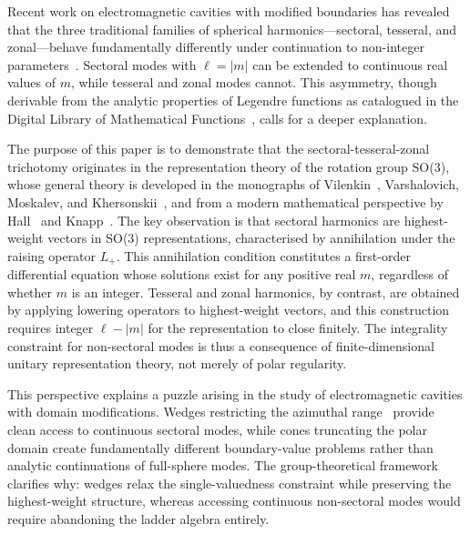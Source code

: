 \documentclass[
  aip,
  amsmath,amssymb,
  preprint
]{revtex4-1}
\begin{document}
Recent work on electromagnetic cavities with modified boundaries has revealed that the three traditional families of spherical harmonics---sectoral, tesseral, and zonal---behave fundamentally differently under continuation to non-integer parameters~\cite{BakrAmari2025, bakrsphere, bakr2025quantummechanicssphericalwedge, bakr2025zerofrequency}. Sectoral modes with $\ell = |m|$ can be extended to continuous real values of $m$, while tesseral and zonal modes cannot. This asymmetry, though derivable from the analytic properties of Legendre functions as catalogued in the Digital Library of Mathematical Functions~\cite{DLMF}, calls for a deeper explanation.

The purpose of this paper is to demonstrate that the sectoral-tesseral-zonal trichotomy originates in the representation theory of the rotation group SO(3), whose general theory is developed in the monographs of Vilenkin~\cite{Vilenkin1968}, Varshalovich, Moskalev, and Khersonskii~\cite{Varshalovich1988}, and from a modern mathematical perspective by Hall~\cite{Hall2015} and Knapp~\cite{Knapp2001}. The key observation is that sectoral harmonics are highest-weight vectors in SO(3) representations, characterised by annihilation under the raising operator $L_+$. This annihilation condition constitutes a first-order differential equation whose solutions exist for any positive real $m$, regardless of whether $m$ is an integer. Tesseral and zonal harmonics, by contrast, are obtained by applying lowering operators to highest-weight vectors, and this construction requires integer $\ell - |m|$ for the representation to close finitely. The integrality constraint for non-sectoral modes is thus a consequence of finite-dimensional unitary representation theory, not merely of polar regularity.

This perspective explains a puzzle arising in the study of electromagnetic cavities with domain modifications. Wedges restricting the azimuthal range~\cite{BakrAmari2023, BakrAmari20251} provide clean access to continuous sectoral modes, while cones truncating the polar domain create fundamentally different boundary-value problems rather than analytic continuations of full-sphere modes. The group-theoretical framework clarifies why: wedges relax the single-valuedness constraint while preserving the highest-weight structure, whereas accessing continuous non-sectoral modes would require abandoning the ladder algebra entirely.
\end{document}

